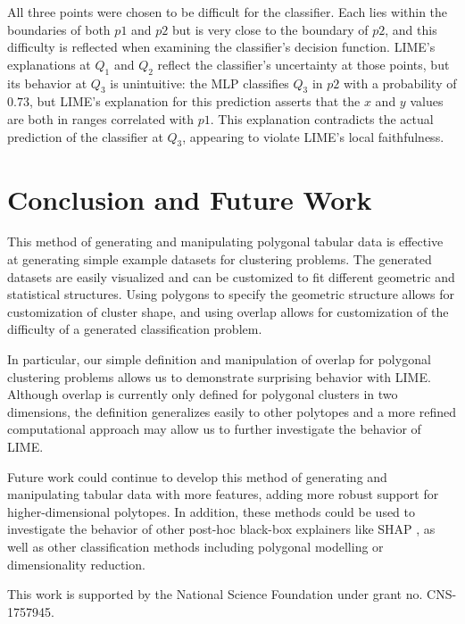 \documentclass[manuscript,screen,review]{acmart}
\begin{document}
All three points were chosen to be difficult for the classifier. Each lies within the boundaries of both $p1$ and $p2$
but is very close to the boundary of $p2$, and this difficulty is reflected when examining the classifier's decision
function. LIME's explanations at $Q_1$ and $Q_2$ reflect the classifier's uncertainty at those points, but its behavior
at $Q_3$ is unintuitive: the MLP classifies $Q_3$ in $p2$ with a probability of $0.73$, but LIME's explanation for
this prediction asserts that the $x$ and $y$ values are both in ranges correlated with $p1$. This explanation contradicts
the actual prediction of the classifier at $Q_3$, appearing to violate LIME's local faithfulness.


\section{Conclusion and Future Work}

This method of generating and manipulating polygonal tabular data is effective at generating simple example
datasets for clustering problems. The generated datasets are easily visualized and can be customized to fit different 
geometric and statistical structures. Using 
    polygons to specify the geometric structure allows for customization of
    cluster shape, and using overlap allows for customization of the difficulty
    of a generated classification problem.

In particular, our simple definition and manipulation of
overlap for polygonal clustering problems allows us to demonstrate surprising behavior with LIME. Although overlap
is currently only defined for polygonal clusters in two dimensions, the definition generalizes easily to other 
polytopes and a more refined computational approach may allow us to further investigate the behavior of LIME.

Future work could continue to develop this method of generating and manipulating tabular data with more features,
adding more robust support for higher-dimensional polytopes. In addition, these methods could be used to investigate
the behavior of other post-hoc black-box explainers like SHAP \cite{xai-pp}, as well as other classification methods
including polygonal modelling \cite{polygon-mining} or dimensionality reduction.

\begin{acks}
This work is supported by the National Science Foundation under grant 
no. CNS-1757945.
\end{acks}
\end{document}

